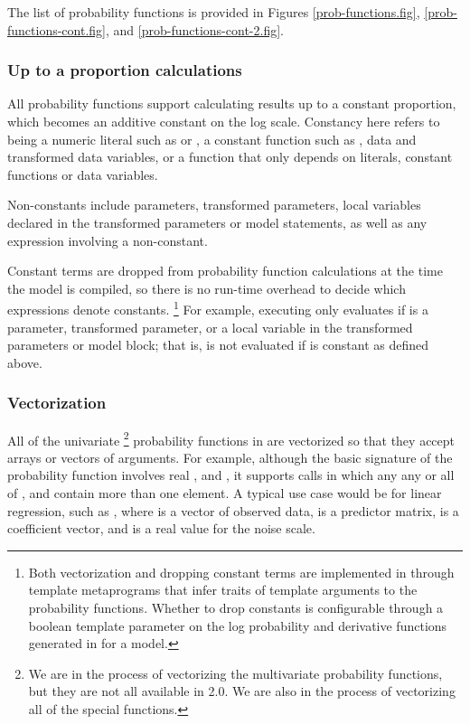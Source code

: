 \documentclass[article]{jss}
\begin{document}
The list of probability functions is provided in Figures
\ref{prob-functions.fig}, \ref{prob-functions-cont.fig}, and
\ref{prob-functions-cont-2.fig}. 

\subsubsection{Up to a proportion calculations}

All probability functions support calculating results up to a constant
proportion, which becomes an additive constant on the log scale.
Constancy here refers to being a numeric literal such as  or
, a constant function such as , data and
transformed data variables, or a function that only depends on
literals, constant functions or data variables.

Non-constants include parameters, transformed parameters, local
variables declared in the transformed parameters or model statements,
as well as any expression involving a non-constant.

Constant terms are dropped from probability function calculations at
the time the model is compiled, so there is no run-time overhead to
decide which expressions denote constants.%
%
\footnote{Both vectorization and dropping constant terms are
  implemented in  through template metaprograms that
  infer traits of template arguments to the probability functions.
  Whether to drop constants is configurable through a boolean template
  parameter on the log probability and derivative functions generated
  in  for a model.}
%
For example, executing  only evaluates
 if  is a parameter, transformed
parameter, or a local variable in the transformed parameters or model
block; that is,  is not evaluated if  is
constant as defined above.  

\subsubsection{Vectorization}

All of the univariate%
%
\footnote{We are in the process of vectorizing the multivariate
  probability functions, but they are not all available in
   2.0.  We are also in the process of vectorizing
  all of the special functions.}
%
probability functions in  are vectorized so that they
accept arrays or vectors of arguments.  For example, although the
basic signature of the probability function
 involves real ,  and
, it supports calls in which any any or all of ,
 and  contain more than one element. A typical
use case would be for linear regression, such as , where  is a vector of observed data,
 is a predictor matrix,  is a coefficient vector,
and  is a real value for the noise scale.
\end{document}
